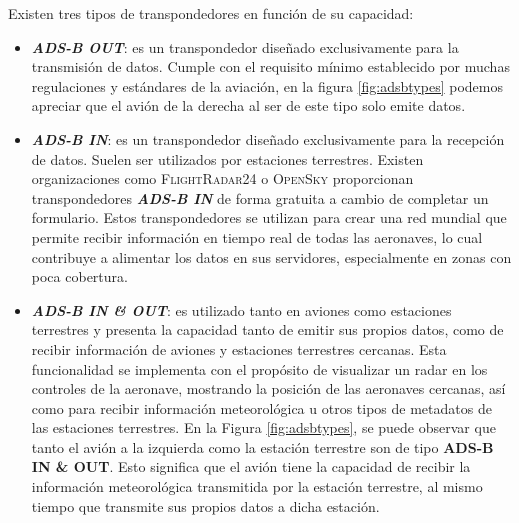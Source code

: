 \documentclass[a4paper, 11pt]{book}
\begin{document}
Existen tres tipos de transpondedores en función de su capacidad:
\begin{itemize}
    \item \textbf{\emph{ADS-B OUT}}: es un transpondedor diseñado exclusivamente para la transmisión de datos. Cumple con el requisito mínimo establecido por muchas regulaciones y estándares de la aviación, en la figura \ref{fig:adsbtypes} podemos apreciar que el avión de la derecha al ser de este tipo solo emite datos.
    \item \textbf{\emph{ADS-B IN}}: es un transpondedor diseñado exclusivamente para la recepción de datos. Suelen ser utilizados por estaciones terrestres. Existen organizaciones como \textsc{FlightRadar24} o \textsc{OpenSky} proporcionan transpondedores \textbf{\emph{ADS-B IN}} de forma gratuita a cambio de completar un formulario. Estos transpondedores se utilizan para crear una red mundial que permite recibir información en tiempo real de todas las aeronaves, lo cual contribuye a alimentar los datos en sus servidores, especialmente en zonas con poca cobertura.
    \item \textbf{\emph{ADS-B IN \& OUT}}: es utilizado tanto en aviones como estaciones terrestres y presenta la capacidad tanto de emitir sus propios datos, como de recibir información de aviones y estaciones terrestres cercanas. Esta funcionalidad se implementa con el propósito de visualizar un radar en los controles de la aeronave, mostrando la posición de las aeronaves cercanas, así como para recibir información meteorológica u otros tipos de metadatos de las estaciones terrestres. En la Figura \ref{fig:adsbtypes}, se puede observar que tanto el avión a la izquierda como la estación terrestre son de tipo \textbf{ADS-B IN \& OUT}. Esto significa que el avión tiene la capacidad de recibir la información meteorológica transmitida por la estación terrestre, al mismo tiempo que transmite sus propios datos a dicha estación.
\end{itemize}
\end{document}
